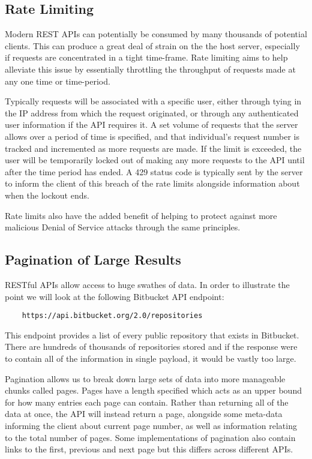 \subsection{Rate Limiting}
Modern REST APIs can potentially be consumed by many thousands of potential clients. This can produce a great deal of strain on the the host server, especially if requests are concentrated in a tight time-frame. Rate limiting aims to help alleviate this issue by essentially throttling the throughput of requests made at any one time or time-period.

Typically requests will be associated with a specific user, either through tying in the IP address from which the request originated, or through any authenticated user information if the API requires it. A set volume of requests that the server allows over a period of time is specified, and that individual's request number is tracked and incremented as more requests are made. If the limit is exceeded, the user will be temporarily locked out of making any more requests to the API until after the time period has ended. A 429 status code is typically sent by the server to inform the client of this breach of the rate limits alongside information about when the lockout ends.

Rate limits also have the added benefit of helping to protect against more malicious Denial of Service attacks through the same principles.
\subsection{Pagination of Large Results}
RESTful APIs allow access to huge swathes of data. In order to illustrate the point we will look at the following Bitbucket API endpoint:
\begin{verbatim}
    https://api.bitbucket.org/2.0/repositories
\end{verbatim}
This endpoint provides a list of every public repository that exists in Bitbucket. There are hundreds of thousands of repositories stored and if the response were to contain all of the information in  single payload, it would be vastly too large.

Pagination allows us to break down large sets of data into more manageable chunks called pages. Pages have a length specified which acts as an upper bound for how many entries each page can contain. Rather than returning all of the data at once, the API will instead return a page, alongside some meta-data informing the client about current page number, as well as information relating to the total number of pages. Some implementations of pagination also contain links to the first, previous and next page but this differs across different APIs.

